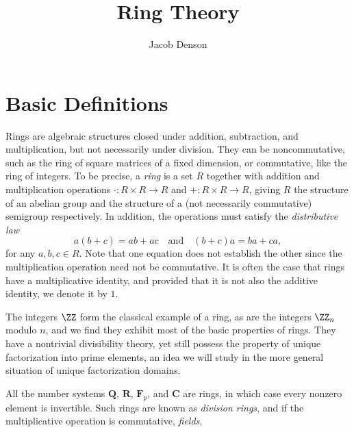 

\title{Ring Theory}
\author{Jacob Denson}



\maketitle
\tableofcontents

\chapter{Basic Definitions}


Rings are algebraic structures closed under addition, subtraction, and multiplication, but not necessarily under division. They can be noncommutative, such as the ring of square matrices of a fixed dimension, or commutative, like the ring of integers. To be precise, a \emph{ring} is a set $R$ together with addition and multiplication operations $\cdot: R \times R \to R$ and $+: R \times R \to R$, giving $R$ the structure of an abelian group and the structure of a (not necessarily commutative) semigroup respectively. In addition, the operations must satisfy the \emph{distributive law}
%
\[ a(b + c) = ab + ac \quad\text{and}\quad (b + c)a = ba + ca, \]
%
for any $a,b,c \in R$. Note that one equation does not establish the other since the multiplication operation need not be commutative. It is often the case that rings have a multiplicative identity, and provided that it is not also the additive identity, we denote it by $1$.

\begin{example}
    The integers $\ZZ$ form the classical example of a ring, as are the integers $\ZZ_n$ modulo $n$, and we find they exhibit most of the basic properties of rings. They have a nontrivial divisibility theory, yet still possess the property of unique factorization into prime elements, an idea we will study in the more general situation of unique factorization domains.
\end{example}

\begin{example}
    All the number systems $\mathbf{Q}$, $\mathbf{R}$, $\mathbf{F}_p$, and $\mathbf{C}$ are rings, in which case every nonzero element is invertible. Such rings are known as \emph{division rings}, and if the multiplicative operation is commutative, \emph{fields}.
\end{example}

